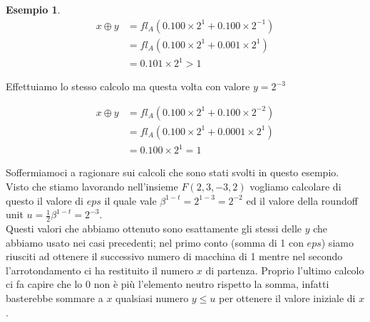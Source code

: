 \documentclass[12pt, a4paper]{book}
\theoremstyle{definition}
\newtheorem{exmp}{Esempio}[section]
\begin{document}
\begin{flushleft}
\begin{exmp}
\begin{equation} \label{}
	\begin{split}
		x \oplus y & = fl_{A}(0.100 \times 2^{1} +  0.100 \times 2^{-1}) \\
 		   				& =  fl_{A}(0.100 \times 2^{1} +  0.001 \times 2^{1}) \\
 		   				& =  0.101 \times 2^{1} > 1
	\end{split}
\end{equation}

Effettuiamo lo stesso calcolo ma questa volta con valore $y=2^{-3}$

\begin{equation} \label{}
	\begin{split}
		x \oplus y & = fl_{A}(0.100 \times 2^{1} +  0.100 \times 2^{-2}) \\
 		   				& =  fl_{A}(0.100 \times 2^{1} +  0.0001 \times 2^{1}) \\
 		   				& =  0.100 \times 2^{1} = 1
	\end{split}
\end{equation}

Soffermiamoci a ragionare sui calcoli che sono stati svolti in questo esempio. Visto che stiamo lavorando nell'insieme $F(2,3,-3,2)$ vogliamo calcolare di questo il valore di $eps$ il quale vale $\beta^{1-t} = 2 ^ {1-3} = 2^{-2}$ ed il valore della roundoff unit $u = \frac{1}{2}\beta^{1-t} = 2^{-3}$.\\
Questi valori che abbiamo ottenuto sono esattamente gli stessi delle $y$ che abbiamo usato nei casi precedenti; nel primo conto (somma di 1 con $eps$) siamo riusciti ad ottenere il successivo numero di macchina di 1 mentre nel secondo l'arrotondamento ci ha restituito il numero $x$ di partenza.
Proprio l'ultimo calcolo ci fa capire che lo 0 non è più l'elemento neutro rispetto la somma,  infatti basterebbe sommare a $x$ qualsiasi numero $y \leq u$ per ottenere il valore iniziale di $x$.
\end{exmp}
\end{flushleft}
\end{document}
